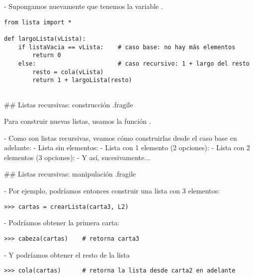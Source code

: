 - Supongamos nuevamente que tenemos la variable .

\begin{lstlisting}[style=frame02]
from lista import *

def largoLista(vLista):
    if listaVacia == vLista:    # caso base: no hay más elementos
        return 0
    else:                       # caso recursivo: 1 + largo del resto
        resto = cola(vLista)
        return 1 + largoLista(resto)
    
\end{lstlisting}

## Listas recursivas: construcción {.fragile}

\bgnblockidea
Para construir nuevas listas, usamos la función .
\trmblockidea

- Como son listas recursivas, veamos cómo construirlas desde el caso base en adelante:
    - Lista sin elementos:\newline
    - Lista con 1 elemento (2 opciones):\newline
        \newline
    - Lista con 2 elementos (3 opciones):\newline
        \newline
        \newline
        \hbox{}
    - Y así, sucesivamente...


## Listas recursivas: manipulación {.fragile}

- Por ejemplo, podríamos entonces construir una lista con 3 elementos:

\begin{lstlisting}[style=frame02]
>>> cartas = crearLista(carta3, L2)
\end{lstlisting}

- Podríamos obtener la primera carta:

\begin{lstlisting}[style=frame02]
>>> cabeza(cartas)    # retorna carta3
\end{lstlisting}

- Y podríamos obtener el resto de la lista

\begin{lstlisting}[style=frame02]
>>> cola(cartas)      # retorna la lista desde carta2 en adelante
\end{lstlisting}

